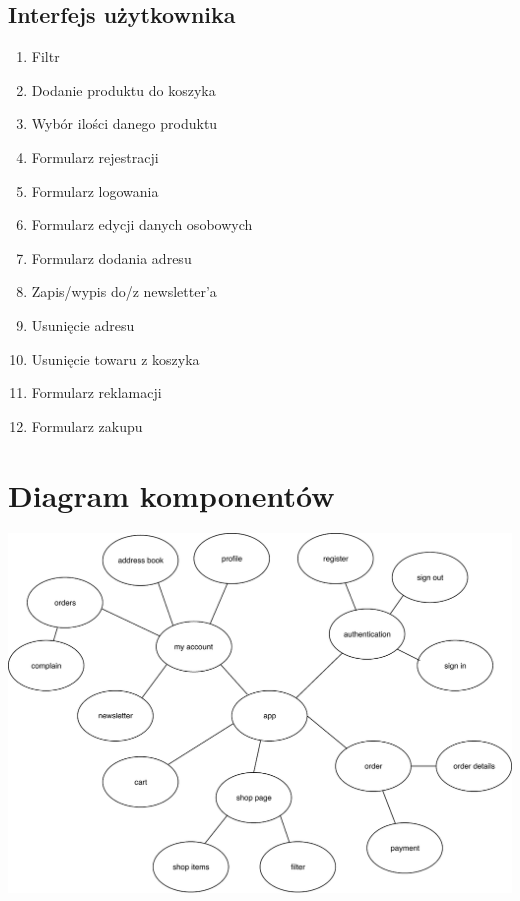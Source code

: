 \documentclass[10pt]{report}
\begin{document}
\subsection{Interfejs użytkownika}

\begin{enumerate}
	\item Filtr
	\item Dodanie produktu do koszyka
	\item Wybór ilości danego produktu
	\item Formularz rejestracji
	\item Formularz logowania
	\item Formularz edycji danych osobowych
	\item Formularz dodania adresu
	\item Zapis/wypis do/z newsletter'a
	\item Usunięcie adresu
	\item Usunięcie towaru z koszyka
	\item Formularz reklamacji
	\item Formularz zakupu
	
\end{enumerate} 

	
	\section{Diagram komponentów}
	\begin{center}
		\includegraphics[width=500pt]{components.pdf}
	\end{center}
\end{document}
